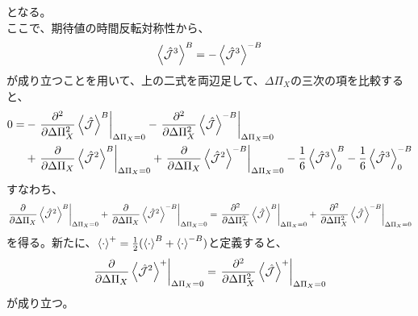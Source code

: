 \documentclass[a4paper,11pt]{jsarticle}
\begin{document}
となる。\\
ここで、期待値の時間反転対称性から、
\begin{align}
    \ev{\hat{\mathcal{J}}^3}^B = -\ev{\hat{\mathcal{J}}^3}^{-B}
\end{align}
が成り立つことを用いて、上の二式を両辺足して、$\Delta \Pi_X$の三次の項を比較すると、
\begin{align*}
    0=&-\left.\pdv[2]{\Delta \Pi_X} \ev{\hat{\mathcal{J}}}^B\right|_{\Delta \Pi_X = 0} - \left.\pdv[2]{\Delta \Pi_X} \ev{\hat{\mathcal{J}}}^{-B}\right|_{\Delta \Pi_X = 0}\\
    &+ \left.\pdv{\Delta \Pi_X} \ev{\hat{\mathcal{J}}^2}^B\right|_{\Delta \Pi_X = 0} + \left.\pdv{\Delta \Pi_X} \ev{\hat{\mathcal{J}}^2}^{-B}\right|_{\Delta \Pi_X = 0} -\frac{1}{6}\ev{\hat{\mathcal{J}}^3}^B_0 - \frac{1}{6}\ev{\hat{\mathcal{J}}^3}^{-B}_0\\
\end{align*}
すなわち、
\begin{align}
    \left.\pdv{\Delta \Pi_X} \ev{\hat{\mathcal{J}}^2}^B\right|_{\Delta \Pi_X = 0} + \left.\pdv{\Delta \Pi_X} \ev{\hat{\mathcal{J}}^2}^{-B}\right|_{\Delta \Pi_X = 0} = \left.\pdv[2]{\Delta \Pi_X} \ev{\hat{\mathcal{J}}}^B\right|_{\Delta \Pi_X = 0} + \left.\pdv[2]{\Delta \Pi_X} \ev{\hat{\mathcal{J}}}^{-B}\right|_{\Delta \Pi_X = 0}
\end{align}
を得る。新たに、$\ev{\cdot}^+ = \frac{1}{2}(\ev{\cdot}^B + \ev{\cdot}^{-B})$と定義すると、
\begin{align}
    \left.\pdv{\Delta \Pi_X} \ev{\hat{\mathcal{J}}^2}^+\right|_{\Delta \Pi_X = 0} = \left.\pdv[2]{\Delta \Pi_X} \ev{\hat{\mathcal{J}}}^+\right|_{\Delta \Pi_X = 0}
\end{align}
が成り立つ。\hfill \qedsymbol
\end{document}
